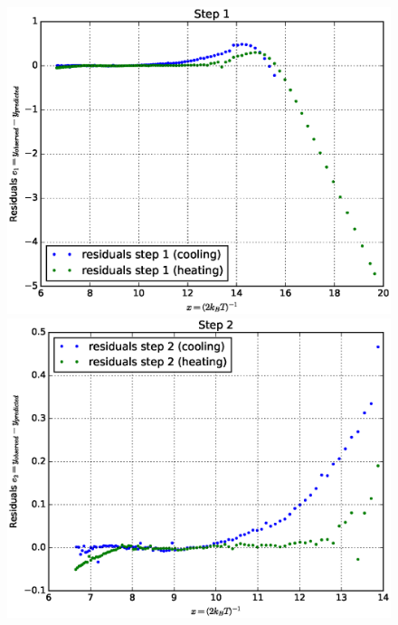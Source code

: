\documentclass[a4paper]{article}
\begin{document}
\begin{figure}[H]
	\captionsetup{singlelinecheck=off}
	\centering
	\begin{minipage}[t]{0.3\textwidth}
		\begin{center}
		\includegraphics[width=1.0\textwidth]{plots/residuals_step1.eps}
		\end{center}
	\end{minipage}
	\begin{minipage}[t]{0.3\textwidth}
		\begin{center}
		\includegraphics[width=1.0\textwidth]{plots/residuals_step2.eps}
		\end{center}

\end{minipage}
\end{figure}
\end{document}
